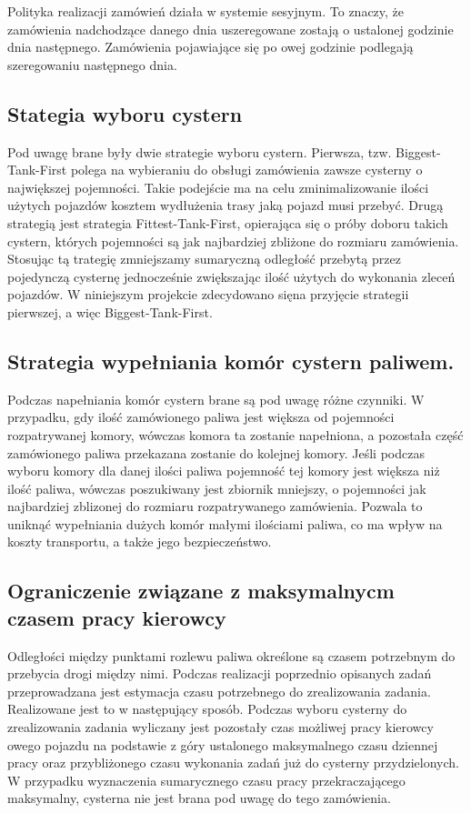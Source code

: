 \documentclass[11pt,a4paper,oneside]{mwart}
\begin{document}
Polityka realizacji zamówień działa w systemie sesyjnym. To znaczy, że zamówienia nadchodzące danego dnia uszeregowane zostają o ustalonej godzinie dnia następnego. Zamówienia pojawiające się po owej godzinie podlegają szeregowaniu następnego dnia.

\subsection{Stategia wyboru cystern}

	Pod uwagę brane były dwie strategie wyboru cystern. Pierwsza, tzw. Biggest-Tank-First polega na wybieraniu do obsługi zamówienia zawsze cysterny o największej pojemności. Takie podejście ma na celu zminimalizowanie ilości użytych pojazdów kosztem wydłużenia trasy jaką pojazd musi przebyć. Drugą strategią jest strategia Fittest-Tank-First, opierająca się o próby doboru takich cystern, których pojemności są jak najbardziej zbliżone do rozmiaru zamówienia. Stosując tą trategię zmniejszamy sumaryczną odległość przebytą przez pojedynczą cysternę jednocześnie zwiększając ilość użytych do wykonania zleceń pojazdów. W niniejszym projekcie zdecydowano sięna przyjęcie strategii pierwszej, a więc Biggest-Tank-First.

  \subsection{Strategia wypełniania komór cystern paliwem.}

	Podczas napełniania komór cystern brane są pod uwagę różne czynniki. W przypadku, gdy ilość zamówionego paliwa jest większa od pojemności rozpatrywanej komory, wówczas komora ta zostanie napełniona, a pozostała część zamówionego paliwa przekazana zostanie do kolejnej komory. Jeśli podczas wyboru komory dla danej ilości paliwa pojemność tej komory jest większa niż ilość paliwa, wówczas poszukiwany jest zbiornik mniejszy, o pojemności jak najbardziej zblizonej do rozmiaru rozpatrywanego zamówienia. Pozwala to uniknąć wypełniania dużych komór małymi ilościami paliwa, co ma wpływ na koszty transportu, a także jego bezpieczeństwo. 

  \subsection{Ograniczenie związane z maksymalnycm czasem pracy kierowcy}
	Odległości między punktami rozlewu paliwa określone są czasem potrzebnym do przebycia drogi między nimi. Podczas realizacji poprzednio opisanych zadań przeprowadzana jest estymacja czasu potrzebnego do zrealizowania zadania. Realizowane jest to w następujący sposób. Podczas wyboru cysterny do zrealizowania zadania wyliczany jest pozostały czas możliwej pracy kierowcy owego pojazdu na podstawie z góry ustalonego maksymalnego czasu dziennej pracy oraz przybliżonego czasu wykonania zadań już do cysterny przydzielonych. W przypadku wyznaczenia sumarycznego czasu pracy przekraczającego maksymalny, cysterna nie jest brana pod uwagę do tego zamówienia.
\end{document}
